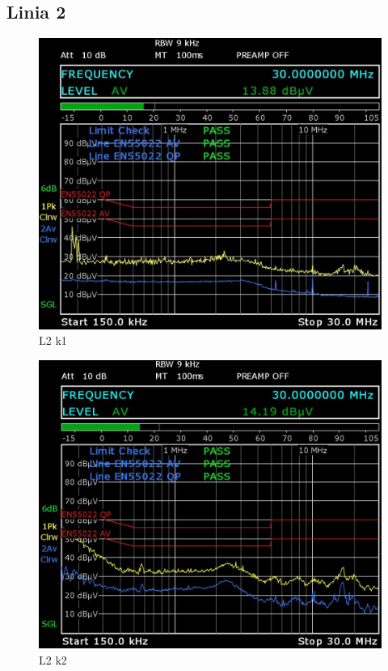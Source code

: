 \documentclass[12pt, a4paper, oneside]{article}
\begin{document}
\subsection{Linia 2}
\begin{figure}[h]
\centering
\caption{L2 k1}
\includegraphics[scale=0.28]{Linia2/k1.png}
\end{figure}
\begin{figure}[h]
\centering
\caption{L2 k2}
\includegraphics[scale=0.28]{Linia2/k2.png}
\end{figure}
\end{document}
